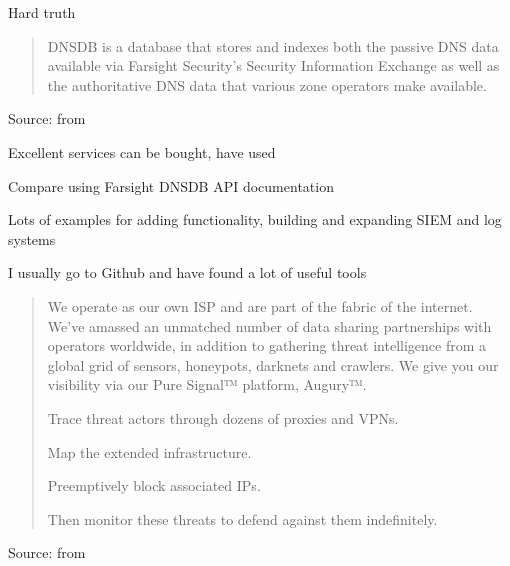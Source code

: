 \documentclass[Screen16to9,17pt]{foils}
\begin{document}
\begin{list2}
  \item Hard truth
\end{list2}



\begin{quote}
DNSDB is a database that stores and indexes both the passive DNS data available via Farsight Security’s Security Information Exchange as well as the authoritative DNS data that various zone operators make available.
\end{quote}
Source: from 
\begin{list2}
  \item Excellent services can be bought, have used 
\item Compare using 
  Farsight DNSDB API documentation
\item {}
\item Lots of examples for adding functionality, building and expanding SIEM and log systems
\item I usually go to Github and have found a lot of useful tools
\end{list2}



\begin{quote}
  We operate as our own ISP and are part of the fabric of the internet. We’ve amassed an unmatched number of data sharing partnerships with operators worldwide, in addition to gathering threat intelligence from a global grid of sensors, honeypots, darknets and crawlers. We give you our visibility via our Pure Signal™ platform, Augury™.

\begin{list2}
\item Trace threat actors through dozens of proxies and VPNs.
\item Map the extended infrastructure.
\item Preemptively block associated IPs.
\item Then monitor these threats to defend against them indefinitely.
\end{list2}
\end{quote}
Source: from 
\end{document}
